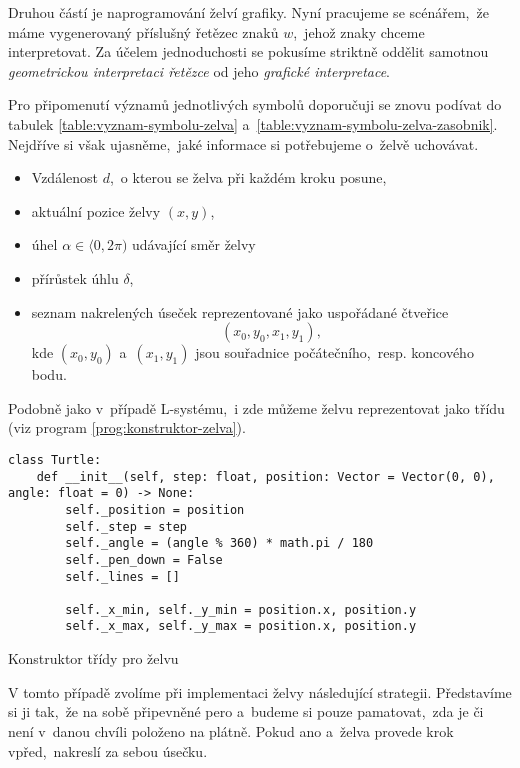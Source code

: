 Druhou částí je naprogramování želví grafiky. Nyní pracujeme se scénářem,~že máme vygenerovaný příslušný řetězec znaků $w$,~jehož znaky chceme interpretovat. Za účelem jednoduchosti se pokusíme striktně oddělit samotnou \emph{geometrickou interpretaci řetězce} od jeho \emph{grafické interpretace}.

Pro připomenutí významů jednotlivých symbolů doporučuji se znovu podívat do tabulek \ref{table:vyznam-symbolu-zelva} a~\ref{table:vyznam-symbolu-zelva-zasobnik}. Nejdříve si však ujasněme,~jaké informace si potřebujeme o~želvě uchovávat.
\begin{itemize}
    \item Vzdálenost $d$,~o kterou se želva při každém kroku posune,
    \item aktuální pozice želvy $(x,y)$,
    \item úhel $\alpha\in\langle 0,2\pi)$ udávající směr želvy
    \item přírůstek úhlu $\delta$,
    \item seznam nakrelených úseček reprezentované jako uspořádané čtveřice
    \[(x_0,y_0,x_1,y_1),\]
    kde $(x_0,y_0)$ a~$(x_1,y_1)$ jsou souřadnice počátečního,~resp. koncového bodu.
\end{itemize}
Podobně jako v~případě L-systému,~i zde můžeme želvu reprezentovat jako třídu (viz program \ref{prog:konstruktor-zelva}).
\begin{program}[h]
\begin{lstlisting}[style=python]
class Turtle:
    def __init__(self, step: float, position: Vector = Vector(0, 0), angle: float = 0) -> None:
        self._position = position
        self._step = step
        self._angle = (angle % 360) * math.pi / 180
        self._pen_down = False
        self._lines = []

        self._x_min, self._y_min = position.x, position.y
        self._x_max, self._y_max = position.x, position.y
\end{lstlisting}
    \caption{Konstruktor třídy pro želvu}
    \label{prog:konstruktor-zelva}
\end{program}

V tomto případě zvolíme při implementaci želvy následující strategii. Představíme si ji tak,~že na sobě připevněné pero a~budeme si pouze pamatovat,~zda je či není v~danou chvíli položeno na plátně. Pokud ano a~želva provede krok vpřed,~nakreslí za sebou úsečku.

